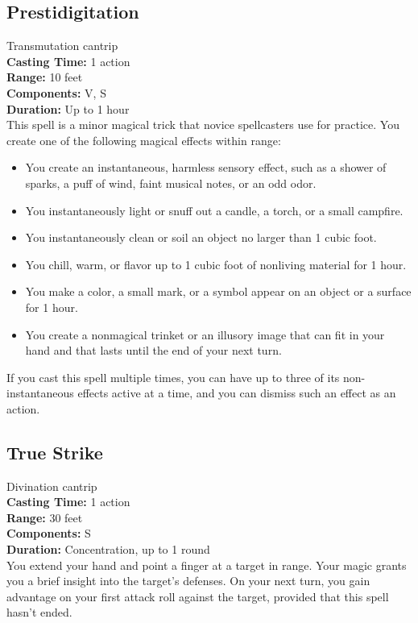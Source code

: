 \documentclass[11pt, A4paper, english]{article}
\begin{document}
		\subsection{Prestidigitation}
Transmutation cantrip \\
\textbf{Casting Time:} 1 action \\
\textbf{Range:} 10 feet \\
\textbf{Components:} V, S \\
\textbf{Duration:} Up to 1 hour \\
This spell is a minor magical trick that novice spellcasters use for practice. You create one of the following magical effects within range:
			\begin{itemize}
\item You create an instantaneous, harmless sensory effect, such as a shower of sparks, a puff of wind, faint musi­cal notes, or an odd odor.
\item You instantaneously light or snuff out a candle, a torch, or a small campfire.
\item You instantaneously clean or soil an object no larger than 1  cubic foot.
\item You chill, warm, or flavor up to 1 cubic foot of nonliv­ing material for 1 hour.
\item You make a color, a small mark, or a symbol appear on an object or a surface for 1 hour.
\item You create a nonmagical trinket or an illusory image that can fit in your hand and that lasts until the end of your next turn.
			\end{itemize}
If you cast this spell multiple times, you can have up to three of its non-instantaneous effects active at a time, and you can dismiss such an effect as an action.

		\subsection{True Strike}
Divination cantrip \\
\textbf{Casting Time:} 1 action \\
\textbf{Range:} 30 feet \\
\textbf{Components:} S \\
\textbf{Duration:} Concentration, up to 1 round \\
You extend your hand and point a finger at a target in range. Your magic grants you a brief insight into the target’s defenses. On your next turn, you gain advantage on your first attack roll against the target, provided that this spell hasn’t ended.
\end{document}
